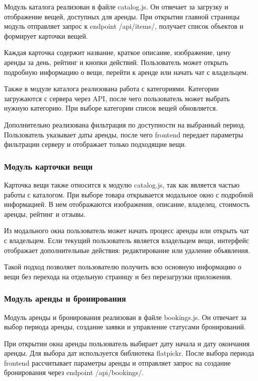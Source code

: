 Модуль каталога реализован в файле catalog.js. Он отвечает за загрузку и отображение вещей, доступных для аренды. При открытии главной страницы модуль отправляет запрос к endpoint /api/items/, получает список объектов и формирует карточки вещей.

Каждая карточка содержит название, краткое описание, изображение, цену аренды за день, рейтинг и кнопки действий. Пользователь может открыть подробную информацию о вещи, перейти к аренде или начать чат с владельцем.

Также в модуле каталога реализована работа с категориями. Категории загружаются с сервера через API, после чего пользователь может выбрать нужную категорию. При выборе категории список вещей обновляется.

Дополнительно реализована фильтрация по доступности на выбранный период. Пользователь указывает даты аренды, после чего frontend передает параметры фильтрации серверу и отображает только подходящие вещи.

\subsubsection{Модуль карточки вещи}

Карточка вещи также относится к модулю catalog.js, так как является частью работы с каталогом. При выборе товара открывается модальное окно с подробной информацией. В нем отображаются изображения, описание, владелец, стоимость аренды, рейтинг и отзывы.

Из модального окна пользователь может начать процесс аренды или открыть чат с владельцем. Если текущий пользователь является владельцем вещи, интерфейс отображает дополнительные действия: редактирование или удаление объявления.

Такой подход позволяет пользователю получить всю основную информацию о вещи без перехода на отдельную страницу и без перезагрузки приложения.

\subsubsection{Модуль аренды и бронирования}

Модуль аренды и бронирования реализован в файле bookings.js. Он отвечает за выбор периода аренды, создание заявки и управление статусами бронирований.

При открытии окна аренды пользователь выбирает дату начала и дату окончания аренды. Для выбора дат используется библиотека flatpickr. После выбора периода frontend рассчитывает параметры аренды и отправляет запрос на создание бронирования через endpoint /api/bookings/.

